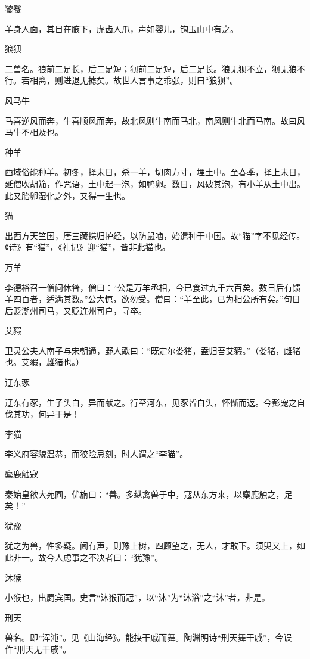 \documentclass[a4paper,12pt,UTF8,twoside]{ctexbook}
\begin{document}
    饕餮
    
    羊身人面，其目在腋下，虎齿人爪，声如婴儿，钩玉山中有之。
    
    狼狈
    
    二兽名。狼前二足长，后二足短；狈前二足短，后二足长。狼无狈不立，狈无狼不行。若相离，则进退无摅矣。故世人言事之乖张，则曰“狼狈”。
    
    风马牛
    
    马喜逆风而奔，牛喜顺风而奔，故北风则牛南而马北，南风则牛北而马南。故曰风马牛不相及也。
    
    种羊
    
    西域俗能种羊。初冬，择未日，杀一羊，切肉方寸，埋土中。至春季，择上未日，延僧吹胡笳，作咒语，土中起一泡，如鸭卵。数日，风破其泡，有小羊从土中出。此又胎卵湿化之外，又得一生也。
    
    猫
    
    出西方天竺国，唐三藏携归护经，以防鼠啮，始遗种于中国。故“猫”字不见经传。《诗》有“猫”，《礼记》迎“猫”，皆非此猫也。
    
    万羊
    
    李德裕召一僧问休咎，僧曰：“公是万羊丞相，今已食过九千六百矣。数日后有馈羊四百者，适满其数。”公大惊，欲勿受。僧曰：“羊至此，已为相公所有矣。”旬日后贬潮州司马，又贬连州司户，寻卒。
    
    艾豭
    
    卫灵公夫人南子与宋朝通，野人歌曰：“既定尔娄猪，盍归吾艾豭。”（娄猪，雌猪也。艾豭，雄猪也。）
    
    辽东豕
    
    辽东有豕，生子头白，异而献之。行至河东，见豕皆白头，怀惭而返。今彭宠之自伐其功，何异于是！
    
    李猫
    
    李义府容貌温恭，而狡险忌刻，时人谓之“李猫”。
    
    麋鹿触寇
    
    秦始皇欲大苑囿，优旃曰：“善。多纵禽兽于中，寇从东方来，以麋鹿触之，足矣！”
    
    犹豫
    
    犹之为兽，性多疑。闻有声，则豫上树，四顾望之，无人，才敢下。须臾又上，如此非一。故今人虑事之不决者曰：“犹豫”。
    
    沐猴
    
    小猴也，出罽宾国。史言“沐猴而冠”，以“沐”为“沐浴”之“沐”者，非是。
    
    刑天
    
    兽名。即“浑沌”。见《山海经》。能挟干戚而舞。陶渊明诗“刑天舞干戚”，今误作“刑天无干戚”。
    
\end{document}
